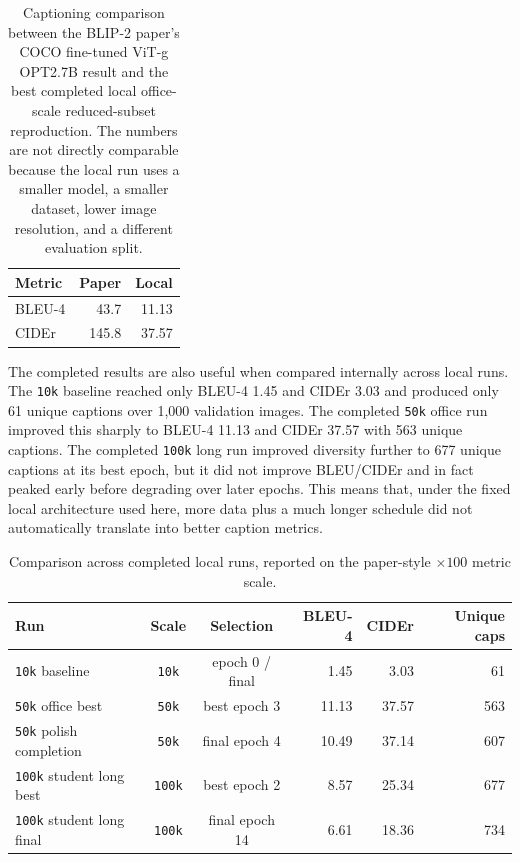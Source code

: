 \documentclass[11pt]{article}
\begin{document}
\begin{table}[t]
\centering
\small
\begin{tabular}{lrr}
\toprule
Metric & Paper & Local \\
\midrule
BLEU-4 & 43.7 & 11.13 \\
CIDEr & 145.8 & 37.57 \\
\bottomrule
\end{tabular}
\caption{Captioning comparison between the BLIP-2 paper's COCO fine-tuned ViT-g OPT2.7B result and the best completed local office-scale reduced-subset reproduction. The numbers are not directly comparable because the local run uses a smaller model, a smaller dataset, lower image resolution, and a different evaluation split.}
\label{tab:metrics}
\end{table}

The completed results are also useful when compared internally across local runs. The \texttt{10k} baseline reached only BLEU-4 1.45 and CIDEr 3.03 and produced only 61 unique captions over 1,000 validation images. The completed \texttt{50k} office run improved this sharply to BLEU-4 11.13 and CIDEr 37.57 with 563 unique captions. The completed \texttt{100k} long run improved diversity further to 677 unique captions at its best epoch, but it did not improve BLEU/CIDEr and in fact peaked early before degrading over later epochs. This means that, under the fixed local architecture used here, more data plus a much longer schedule did not automatically translate into better caption metrics.

\begin{table}[t]
\centering
\small
\begin{tabular}{lccrrr}
\toprule
Run & Scale & Selection & BLEU-4 & CIDEr & Unique caps \\
\midrule
\texttt{10k} baseline & \texttt{10k} & epoch 0 / final & 1.45 & 3.03 & 61 \\
\texttt{50k} office best & \texttt{50k} & best epoch 3 & 11.13 & 37.57 & 563 \\
\texttt{50k} polish completion & \texttt{50k} & final epoch 4 & 10.49 & 37.14 & 607 \\
\texttt{100k} student long best & \texttt{100k} & best epoch 2 & 8.57 & 25.34 & 677 \\
\texttt{100k} student long final & \texttt{100k} & final epoch 14 & 6.61 & 18.36 & 734 \\
\bottomrule
\end{tabular}
\caption{Comparison across completed local runs, reported on the paper-style $\times 100$ metric scale.}
\label{tab:internal-scaling}
\end{table}
\end{document}
